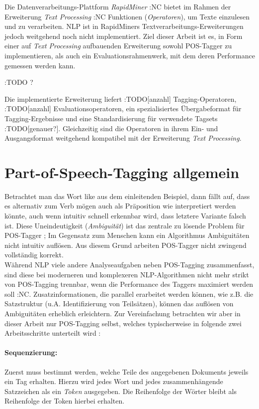 Die Datenverarbeitungs-Plattform \textit{RapidMiner} :NC bietet im Rahmen der Erweiterung \textit{Text Processing} :NC Funktionen (\textit{Operatoren}), um Texte einzulesen und zu verarbeiten. NLP ist in RapidMiners Textverarbeitungs-Erweiterungen jedoch weitgehend noch nicht implementiert. Ziel dieser Arbeit ist es, in Form einer auf \textit{Text Processing} aufbauenden Erweiterung sowohl POS-Tagger zu implementieren, als auch ein Evaluationsrahmenwerk, mit dem deren Performance gemessen werden kann.

:TODO ?

Die implementierte Erweiterung liefert :TODO[anzahl] Tagging-Operatoren, :TODO[anzahl] Evaluationsoperatoren, ein spezialisiertes Übergabeformat für Tagging-Ergebnisse und eine Standardisierung für verwendete Tagsets :TODO[genauer?]. Gleichzeitig sind die Operatoren in ihrem Ein- und Ausgangsformat weitgehend kompatibel mit der Erweiterung \textit{Text Processing}.

\section{Part-of-Speech-Tagging allgemein}
\label{sec:intro:pos}

Betrachtet man das Wort \glqq like\grqq{} aus dem einleitenden Beispiel, dann fällt auf, dass es alternativ zum Verb \glqq mögen\grqq{} auch als Präposition \glqq wie\grqq{} interpretiert werden könnte, auch wenn intuitiv schnell erkennbar wird, dass letztere Variante falsch ist. Diese Uneindeutigkeit (\textit{Ambiguität}) ist das zentrale zu lösende Problem für POS-Tagger  \cite{Smith}; Im Gegensatz zum Menschen kann ein Algorithmus Ambiguitäten nicht intuitiv auflösen. Aus diesem Grund arbeiten POS-Tagger nicht zwingend vollständig korrekt.
\\
Während NLP viele andere Analyseaufgaben neben POS-Tagging zusammenfasst, sind diese bei moderneren und komplexeren NLP-Algorithmen nicht mehr strikt von POS-Tagging trennbar, wenn die Performance des Taggers maximiert werden soll :NC. Zusatzinformationen, die parallel erarbeitet werden können, wie z.B. die Satzstruktur (u.A. Identifizierung von Teilsätzen), können das auflösen von Ambiguitäten erheblich erleichtern. Zur Vereinfachung betrachten wir aber in dieser Arbeit nur POS-Tagging selbst, welches typischerweise in folgende zwei Arbeitsschritte unterteilt wird \cite{Smith}:

\paragraph{Sequenzierung:} Zuerst muss bestimmt werden, welche Teile des angegebenen Dokuments jeweils ein Tag erhalten. Hierzu wird jedes Wort und jedes zusammenhängende Satzzeichen als ein \textit{Token} ausgegeben. Die Reihenfolge der Wörter bleibt als Reihenfolge der Token hierbei erhalten. 
